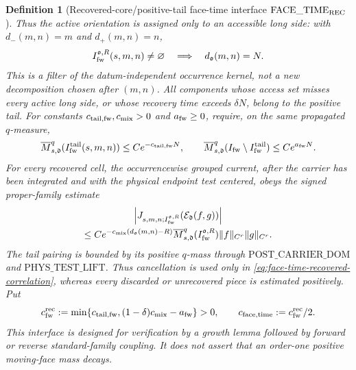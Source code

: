 \documentclass[11pt]{article}
\newtheorem{definition}[theorem]{Definition}
\begin{document}
\begin{definition}[Recovered-core/positive-tail face-time interface
$\mathrm{FACE\_TIME}_{\rm REC}$]
Thus the active orientation is assigned only to an accessible long side:
with $d_-(m,n)=m$ and $d_+(m,n)=n$,
\begin{equation}
\label{eq:face-time-long-side-record}
 I_{\rm fw}^{\mathfrak o,R}(s,m,n)\ne\varnothing
 \quad\Longrightarrow\quad d_{\mathfrak o}(m,n)=N.
\end{equation}
This is a filter of the datum-independent occurrence kernel, not a new
decomposition chosen after $(m,n)$.  All components whose access
set misses every active long side, or whose recovery time exceeds
$\delta N$, belong to the positive tail.  For constants
$c_{\rm tail,fw},c_{\rm mix}>0$ and
$a_{\rm fw}\ge0$, require, on the same propagated $q$-measure,
\begin{equation}
\label{eq:face-time-recovery-tail}
 \overline M_{s,\mathfrak d}^{q}(I_{\rm fw}^{\rm tail}(s,m,n))
 \le C e^{-c_{\rm tail,fw}N},
 \qquad
 \overline M_{s,\mathfrak d}^{q}(I_{\rm fw}\setminus
 I_{\rm fw}^{\rm tail})\le Ce^{a_{\rm fw}N}.
\end{equation}
For every recovered cell, the occurrencewise grouped current, after the
carrier has been integrated and with the physical endpoint test centered,
obeys the signed proper-family estimate
\begin{multline}
\label{eq:face-time-recovered-correlation}
 \left|J_{s,m,n;I_{\rm fw}^{\mathfrak o,R}}
       (\mathcal E_{\mathfrak d}(f,g))\right|\\
 \le C e^{-c_{\rm mix}(d_{\mathfrak o}(m,n)-R)}
 \overline M_{s,\mathfrak d}^{q}
       (I_{\rm fw}^{\mathfrak o,R})
 \|f\|_{C^r}\|g\|_{C^r}.
\end{multline}
The tail pairing is bounded by its positive $q$-mass through
$\mathrm{POST\_CARRIER\_DOM}$ and
$\mathrm{PHYS\_TEST\_LIFT}$.  Thus cancellation is used only in
\eqref{eq:face-time-recovered-correlation}, whereas every discarded or
unrecovered piece is estimated positively.  Put
\begin{equation}
\label{eq:face-time-recovered-rate}
 c_{\rm fw}^{\rm rec}:=
 \min\{c_{\rm tail,fw},(1-\delta)c_{\rm mix}-a_{\rm fw}\}>0,
 \qquad c_{\rm face,time}:=c_{\rm fw}^{\rm rec}/2.
\end{equation}
This interface is designed for verification by a growth lemma followed by
forward or reverse standard-family coupling.  It does not assert that an
order-one positive moving-face mass decays.
\end{definition}
\end{document}
